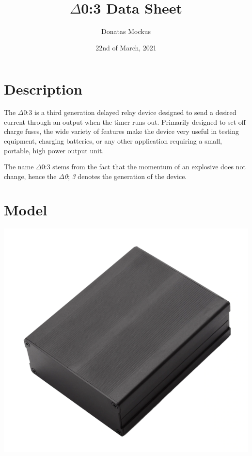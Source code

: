 \documentclass{article}
\title{\textbf{$\Delta$0:3 Data Sheet}}
\author{Donatas Mockus}
\date{22nd of March, 2021}
\begin{document}
\maketitle

\begin{multicols}{2}
	\section{Description}
	The $\Delta$0:3 is a third generation delayed relay device designed to send a desired current through
	an output when the timer runs out. Primarily designed to set off charge fuses, the wide
	variety of features make the device very useful in testing equipment, charging batteries,
	or any other application requiring a small, portable, high power output unit.

	The name $\Delta$0:3 stems from the fact that the momentum of an explosive does not change,
	hence the \textit{$\Delta$0}; \textit{3} denotes the generation of the device.

	\section{Model}
	\begin{center}
		\includegraphics[scale=0.25]{model}
	\end{center}

	\columnbreak


\end{multicols}
\end{document}
